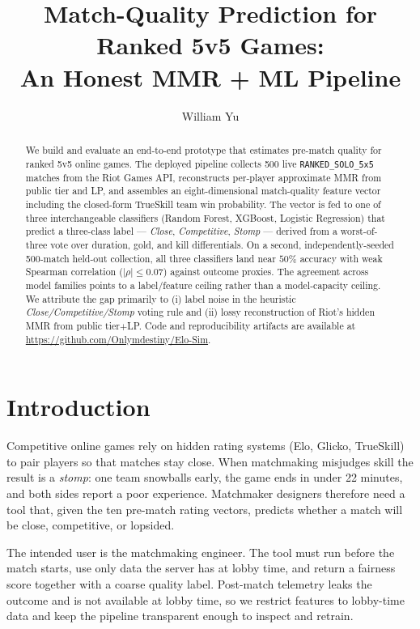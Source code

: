 \documentclass{article}
\title{Match-Quality Prediction for Ranked 5v5 Games:\\
An Honest MMR + ML Pipeline}
\author{William Yu}
\begin{document}
\maketitle

\begin{abstract}
We build and evaluate an end-to-end prototype that estimates pre-match quality
for ranked 5v5 online games. The deployed pipeline collects 500 live
\texttt{RANKED\_SOLO\_5x5} matches from the Riot Games API, reconstructs
per-player approximate MMR from public tier and LP, and assembles an
eight-dimensional match-quality feature vector including the closed-form
TrueSkill team win probability. The vector is fed to one of three
interchangeable classifiers (Random Forest, XGBoost, Logistic Regression)
that predict a three-class label --- \emph{Close}, \emph{Competitive},
\emph{Stomp} --- derived from a worst-of-three vote over duration, gold,
and kill differentials. On a second, independently-seeded 500-match
held-out collection, all three classifiers land near $50\%$ accuracy
with weak Spearman correlation ($|\rho|\!\le\!0.07$) against outcome
proxies. The agreement across model families points to a label/feature
ceiling rather than a model-capacity ceiling. We attribute the gap
primarily to (i) label noise in the heuristic
\emph{Close/Competitive/Stomp} voting rule and (ii) lossy reconstruction of
Riot's hidden MMR from public tier$+$LP.
Code and reproducibility artifacts are available at
\url{https://github.com/Onlymdestiny/Elo-Sim}.
\end{abstract}

\section{Introduction}  

Competitive online games rely on hidden rating systems (Elo, Glicko,
TrueSkill) to pair players so that matches stay close. When matchmaking
misjudges skill the result is a \emph{stomp}: one team snowballs early,
the game ends in under 22 minutes, and both sides report a poor
experience. Matchmaker designers therefore need a tool that, given the
ten pre-match rating vectors, predicts whether a match will be close,
competitive, or lopsided.

The intended user is the matchmaking engineer. The tool must run before
the match starts, use only data the server has at lobby time, and return
a fairness score together with a coarse quality label. Post-match
telemetry leaks the outcome and is not available at lobby time, so we
restrict features to lobby-time data and keep the pipeline transparent
enough to inspect and retrain.
\end{document}
